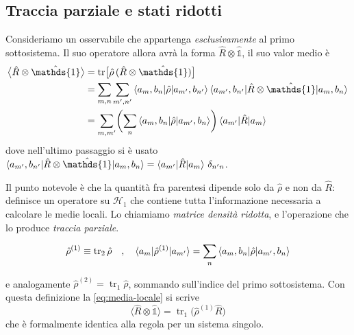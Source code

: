\newpage

\subsection{Traccia parziale e stati ridotti}

Consideriamo un osservabile che appartenga \emph{esclusivamente} al primo sottosistema. Il suo operatore allora avrà la forma $\hat{R} \otimes \hat{\mathds{1}}$, il suo valor medio è 
\begin{align}
    \bigl\langle \hat{R} \otimes \hat{\mathds{1}} \bigr\rangle
    &= \operatorname{tr} \bigl[ \hat{\rho} \, (\hat{R} \otimes
       \hat{\mathds{1}}) \bigr] \nonumber \\
    &= \sum_{m,n} \sum_{m',n'}
       \braket{a_m, b_n | \hat{\rho} | a_{m'}, b_{n'}}
       \braket{a_{m'}, b_{n'} | \hat{R} \otimes \hat{\mathds{1}} | a_m, b_n}
       \nonumber \\
    &= \sum_{m,m'} \biggl( \sum_n
       \braket{a_m, b_n | \hat{\rho} | a_{m'}, b_n} \biggr)
       \braket{a_{m'} | \hat{R} | a_m}
    \label{eq:media-locale}
\end{align}
dove nell'ultimo passaggio si è usato $\braket{a_{m'}, b_{n'} | \hat{R} \otimes \hat{\mathds{1}} | a_m, b_n} = \braket{a_{m'} | \hat{R} | a_m} \, \delta_{n'n}$.

Il punto notevole è che la quantità fra parentesi dipende solo da $\hat{\rho}$ e non da $\hat{R}$: definisce un operatore su $\mathcal{H}_1$ che contiene tutta l'informazione necessaria a calcolare le medie locali. Lo chiamiamo \emph{matrice densità ridotta}, e l'operazione che lo produce \emph{traccia parziale}.
%
\begin{tcolorbox}[colback=black!5!white, colframe=black!45!white, boxrule=0.8pt]
\begin{equation}
    \hat{\rho}^{(1)} \equiv \operatorname{tr}_2 \hat{\rho} \quad , \quad \braket{a_m | \hat{\rho}^{(1)} | a_{m'}} = \sum_n \braket{a_m, b_n | \hat{\rho} | a_{m'}, b_n}
    \label{eq:traccia-parziale}
\end{equation}
\end{tcolorbox}
%
e analogamente $\hat{\rho}^{(2)} = \operatorname{tr}_1 \hat{\rho}$, sommando sull'indice del primo sottosistema. Con questa definizione la \eqref{eq:media-locale} si scrive
%
\begin{equation}
    \bigl\langle \hat{R} \otimes \hat{\mathds{1}} \bigr\rangle
    = \operatorname{tr}_1 \bigl( \hat{\rho}^{(1)} \hat{R} \bigr)
    \label{eq:media-ridotta}
\end{equation}
%
che è formalmente identica alla regola per un sistema singolo.

